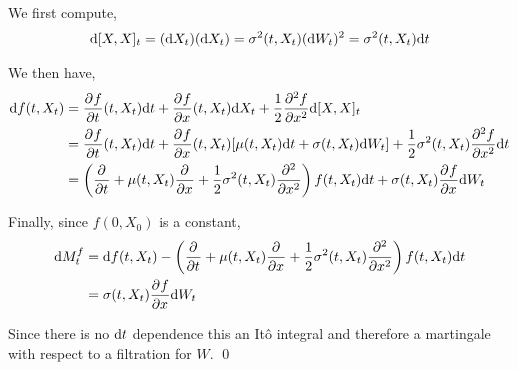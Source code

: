 \begin{solution}[Solution]
We first compute,
\begin{align*}
    \d[X,X]_t = (\d X_t)(\d X_t) = \sigma^2(t,X_t) (\d W_t)^2 = \sigma^2(t,X_t)\d t
\end{align*}

We then have,
\begin{align*}
    \d f(t,X_t) &= \pp{f}{t}(t,X_t) \d t + \pp{f}{x}(t,X_t) \d X_t + \dfrac{1}{2}\pp[2]{f}{x}\d[X,X]_t 
    \\&= \pp{f}{t}(t,X_t) \d t + \pp{f}{x}(t,X_t)  [\mu(t,X_t)\d t +  \sigma(t,X_t)\d W_t] + \dfrac{1}{2}\sigma^2(t,X_t) \pp[2]{f}{x} \d t 
    \\&= \left( \pp{}{t} + \mu(t,X_t) \pp{}{x} + \dfrac{1}{2}\sigma^2(t,X_t) \pp[2]{}{x} \right) f(t,X_t) \d t + \sigma(t,X_t) \pp{f}{x} \d W_t 
\end{align*}

Finally, since \( f(0,X_0) \) is a constant,
\begin{align*}
    \d M_t^f &= \d f(t,X_t) - \left( \pp{}{t} + \mu(t,X_t)\pp{}{x} + \dfrac{1}{2}\sigma^2(t,X_t) \pp[2]{}{x} \right) f(t,X_t) \d t \\
    &= \sigma(t,X_t) \pp{f}{x} \d W_t 
\end{align*}

Since there is no \( \d t \) dependence this an It\^o integral and therefore a martingale with respect to a filtration for \( W \). \qed
\end{solution}



